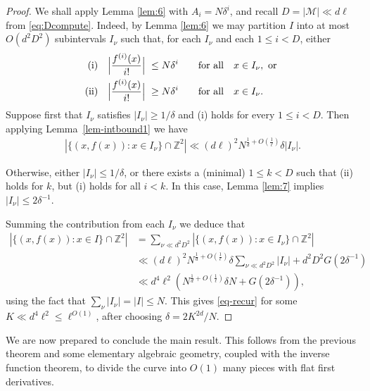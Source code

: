 \documentclass[12pt]{amsart}
\newcommand{\Z}{{\mathbb Z}}
\newcommand{\1}{{\mathbf 1}}
\theoremstyle{remark}
\theoremstyle{definition}
\begin{document}
\begin{proof}
We shall apply Lemma \ref{lem:6} with $A_i=N\delta^i$, and  recall $D=|\mathcal M|\ll d\ell$ from \eqref{eq:Dcompute}. Indeed, by Lemma \ref{lem:6} we may partition $I$ into at most $O(d^2D^2)$ subintervals $I_\nu$ such that, for each $I_\nu$ and each $1\le i<D$, either 
\begin{align*}
{\rm (i)} & &\Big|\frac{f^{(i)}(x)}{i!}\Big| \ &\le N\delta^i \qquad {\rm for \ all }\quad x\in I_\nu,\textrm{ or }\\
{\rm (ii)} & &\Big|\frac{f^{(i)}(x)}{i!}\Big| \ &\ge N\delta^i  \qquad {\rm for \ all }\quad x\in I_\nu.
\end{align*}
Suppose first that $I_\nu$ satisfies $\lvert I_\nu\rvert \geq 1/\delta$ and (i) holds for every $1\leq i<D$. Then applying Lemma~\ref{lem-intbound1} we have
\begin{align*}
\left\lvert \big\{ (x,f(x)) : x\in I_\nu\big\}\cap \Z^2\right\rvert\ll
(d\ell)^2 N^{\frac{1}{d}+O(\frac{1}{\ell})}\delta|I_\nu|.
\end{align*}

Otherwise, either $\lvert I_\nu\rvert \leq 1/\delta$, or there exists a (minimal) $1\le k<D$ such that (ii) holds for $k$, but (i) holds for all $i<k$. In this case, Lemma \ref{lem:7} implies $|I_\nu| \le 2\delta^{-1}$.

Summing the contribution from each $I_\nu$ we deduce that 
\begin{align*}
\left\lvert \big\{(x,f(x)) : x \in I \big\}\cap \Z^2 \right\rvert & =  \sum_{\nu\ll d^2D^2}\left\lvert \big\{(x,f(x)) : x \in I_\nu \big\}\cap \Z^2 \right\rvert\\
& \ll (d\ell)^2 N^{\frac{1}{d}+O(\frac{1}{\ell})}\delta \sum_{\nu\ll d^2D^2}|I_\nu|+ d^2D^2G(2\delta^{-1}) \\
&\ll d^4\ell^2 \left( N^{\frac{1}{d}+O(\frac{1}{\ell})}\delta N +G(2\delta^{-1})\right),
\end{align*}
using the fact that $\sum_\nu \lvert I_\nu\rvert=\lvert I\rvert\leq N$. This gives \eqref{eq-recur} for some $K\ll d^4\ell^2\leq\ell^{O(1)}$, after choosing $\delta = 2K^{2d}/N$.
\end{proof}

We are now prepared to conclude the main result. This follows from the previous theorem and some elementary algebraic geometry, coupled with the inverse function theorem, to divide the curve into $O(1)$ many pieces with flat first derivatives. 
\end{document}

